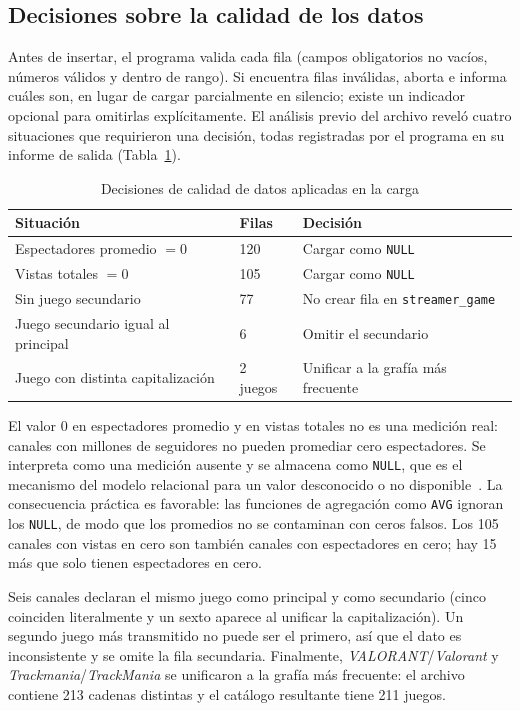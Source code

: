 \documentclass[conference]{IEEEtran}
\begin{document}
\subsection{Decisiones sobre la calidad de los datos}
Antes de insertar, el programa valida cada fila (campos obligatorios no vacíos, números válidos y dentro de rango). Si encuentra filas inválidas, aborta e informa cuáles son, en lugar de cargar parcialmente en silencio; existe un indicador opcional para omitirlas explícitamente. El análisis previo del archivo reveló cuatro situaciones que requirieron una decisión, todas registradas por el programa en su informe de salida (Tabla~\ref{tab:quality}).

\begin{table}[!t]
\caption{Decisiones de calidad de datos aplicadas en la carga}
\label{tab:quality}
\centering
\footnotesize
\begin{tabular}{@{}p{3.3cm}p{1.1cm}p{3.3cm}@{}}
\toprule
Situación & Filas & Decisión \\
\midrule
Espectadores promedio $=0$ & 120 & Cargar como \texttt{NULL} \\
Vistas totales $=0$ & 105 & Cargar como \texttt{NULL} \\
Sin juego secundario & 77 & No crear fila en \texttt{streamer\_game} \\
Juego secundario igual al principal & 6 & Omitir el secundario \\
Juego con distinta capitalización & 2 juegos & Unificar a la grafía más frecuente \\
\bottomrule
\end{tabular}
\end{table}

El valor $0$ en espectadores promedio y en vistas totales no es una medición real: canales con millones de seguidores no pueden promediar cero espectadores. Se interpreta como una medición ausente y se almacena como \texttt{NULL}, que es el mecanismo del modelo relacional para un valor desconocido o no disponible~\cite{elmasri16}. La consecuencia práctica es favorable: las funciones de agregación como \texttt{AVG} ignoran los \texttt{NULL}, de modo que los promedios no se contaminan con ceros falsos. Los 105 canales con vistas en cero son también canales con espectadores en cero; hay 15 más que solo tienen espectadores en cero.

Seis canales declaran el mismo juego como principal y como secundario (cinco coinciden literalmente y un sexto aparece al unificar la capitalización). Un segundo juego más transmitido no puede ser el primero, así que el dato es inconsistente y se omite la fila secundaria. Finalmente, \emph{VALORANT}/\emph{Valorant} y \emph{Trackmania}/\emph{TrackMania} se unificaron a la grafía más frecuente: el archivo contiene 213 cadenas distintas y el catálogo resultante tiene 211 juegos.
\end{document}
